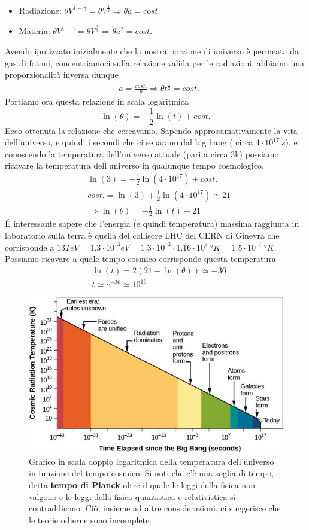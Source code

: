 \documentclass[10pt,a4paper]{article}
\begin{document}
\begin{itemize}
	\item Radiazione: \(\theta V^{1-\gamma} = \theta V^{\frac{1}{3}} \Rightarrow \theta a = cost.\)
	\item Materia: \(\theta V^{1-\gamma} = \theta V^{\frac{2}{3}} \Rightarrow \theta a^2 = cost.\)
\end{itemize}
Avendo ipotizzato inizialmente  che la nostra porzione di universo è permeata da gas di fotoni, concentriamoci sulla relazione valida per le radiazioni, abbiamo una proporzionalità inversa dunque
\begin{align*}
	&a = \frac{cost.}{\theta} \Rightarrow  \theta t^{\frac{1}{2}} = cost.
\end{align*}
Portiamo ora questa relazione in scala logaritmica
\[\ln(\theta) = -\frac{1}{2}\ln(t) + cost.\]
Ecco ottenuta la relazione che cercavamo. Sapendo approssimativamente la vita dell'universo, e quindi i secondi che ci separano dal big bang ( circa $4\cdot 10^{17}\ s$), e conoscendo la temperatura dell'universo attuale (pari a circa 3\textdegree k) possiamo ricavare la temperatura dell'universo in qualunque tempo cosmologico. 
\begin{align*}
	&\ln(3) = -\frac{1}{2}\ln(4\cdot10^17) + cost.\\
	& cost. = \ln(3) + \frac{1}{2}\ln(4\cdot10^{17}) \simeq 21\\
	&\Rightarrow \ln(\theta) = -\frac{1}{2}\ln(t) + 21
\end{align*}
\'{E} interessante sapere che l'energia (e quindi temperatura) massima raggiunta in laboratorio sulla terra è quella del collisore LHC del CERN di Ginevra che corrisponde a $13 TeV = 1.3 \cdot 10^{13} eV = 1.3 \cdot 10^{13} \cdot 1.16 \cdot 10^4\ °K = 1.5\cdot 10^{17}\ °K $. Possiamo ricavare a quale tempo cosmico corrisponde questa temperatura
\begin{align*}
	& \ln(t) = 2(21 -\ln(\theta)) \simeq -36 \\
	& t \simeq e^{-36} \simeq 10^{16}
\end{align*}
\begin{figure}[h!]
	\centering
	\includegraphics[width=0.6\linewidth]{../images/temperatura_universo}
	\caption{Grafico in scala doppio logaritmica della temperatura dell'universo in funzione del tempo cosmico. Si noti che c'è una soglia di tempo, detta \textbf{tempo di Planck} oltre il quale le leggi della fisica non valgono e le leggi della fisica quantistica e relativistica si contraddicono. Ciò, insieme ad altre considerazioni, ci suggerisce che le teorie odierne sono incomplete.}
	\label{fig:temperaturauniverso}
\end{figure}
\end{document}
